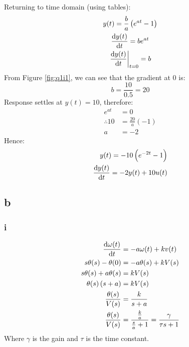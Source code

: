 \documentclass[11pt]{article}
\numberwithin{equation}{section}
\begin{document}
Returning to time domain (using tables):
\begin{gather}
    y(t) = \frac{b}{a} \left(e^{at}-1\right) \label{eq:q1i2}\\
    \frac{\dif y(t)}{\dif t} = be^{at}\\
    \left. \frac{\dif y(t)}{\dif t} \right|_{t = 0} = b
\end{gather}
From Figure \ref{fig:q1i1}, we can see that the gradient at 0 is:
\begin{equation}
    b = \frac{10}{0.5} = 20
\end{equation}
Response settles at $y(t) = 10$, therefore:
\begin{align}
    e^{at} &= 0\\
    \therefore 10 &= \frac{20}{a}\left(-1\right)\\
    a &= -2
\end{align}
Hence:
\begin{align}
    y(t) = -10 \left(e^{-2t}-1\right)\\
    \frac{\dif y(t)}{\dif t} = -2y(t) + 10u(t)
\end{align}
\subsection{b}
\subsubsection{i}
\begin{align}
    \frac{\dif \omega(t)}{\dif t} &= -a\omega(t) + kv(t)\\
    s \theta(s) - \theta(0) &= -a \theta(s) + kV(s)\\
    s\theta(s) +a\theta (s) &= kV(s)\\
    \theta(s)\left(s+a\right) &= kV(s)\\
    \frac{\theta (s)}{V(s)} &= \frac{k}{s+a}\\
    \frac{\theta (s)}{V(s)} &= \frac{\frac{k}{a}}{\frac{s}{a}+1} = \frac{\gamma}{\tau s + 1}
\end{align}
Where $\gamma$ is the gain and $\tau$ is the time constant.
\end{document}
